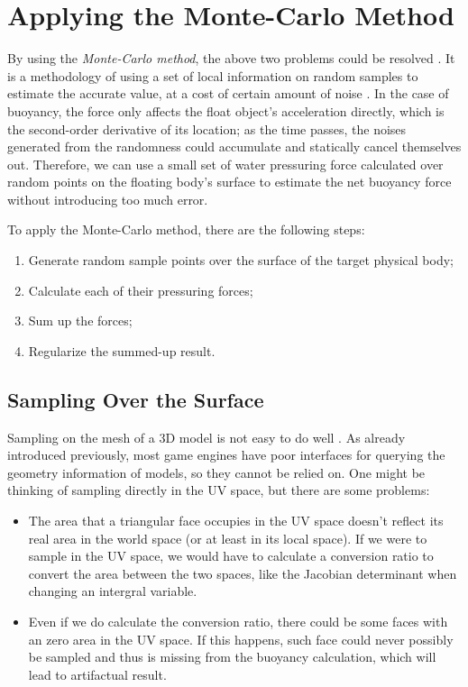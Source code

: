 \section{Applying the Monte-Carlo Method}

By using the \emph{Monte-Carlo method}, the above two problems could be resolved \cite{kroese2014monte}.
It is a methodology of using a set of local information on random samples to estimate the accurate value, at a cost of certain amount of noise \cite{james1980monte}.
In the case of buoyancy, the force only affects the float object's acceleration directly, which is the second-order derivative of its location;
as the time passes, the noises generated from the randomness could accumulate and statically cancel themselves out.
Therefore, we can use a small set of water pressuring force calculated over random points on the floating body's surface to estimate the net buoyancy force without introducing too much error.

To apply the Monte-Carlo method, there are the following steps:
\begin{enumerate}
	\item Generate random sample points over the surface of the target physical body;
	\item Calculate each of their pressuring forces;
	\item Sum up the forces;
	\item Regularize the summed-up result.
\end{enumerate}

\subsection{Sampling Over the Surface}

Sampling on the mesh of a 3D model is not easy to do well \cite{ebeida2012uniform}.
As already introduced previously, most game engines have poor interfaces for querying the geometry information of models, so they cannot be relied on.
One might be thinking of sampling directly in the UV space, but there are some problems:
\begin{itemize}
	\item
		The area that a triangular face occupies in the UV space doesn't reflect its real area in the world space (or at least in its local space).
		If we were to sample in the UV space, we would have to calculate a conversion ratio to convert the area between the two spaces, like the Jacobian determinant when changing an intergral variable.
	\item Even if we do calculate the conversion ratio, there could be some faces with an zero area in the UV space.
		If this happens, such face could never possibly be sampled and thus is missing from the buoyancy calculation, which will lead to artifactual result.
\end{itemize}

